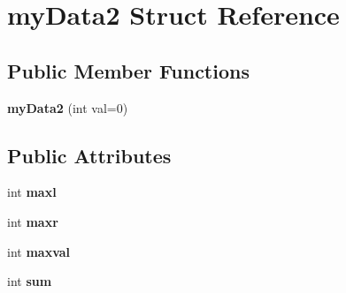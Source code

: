 \hypertarget{structmy_data2}{}\section{my\+Data2 Struct Reference}
\label{structmy_data2}
\subsection*{Public Member Functions}
\begin{DoxyCompactItemize}
\item 
\mbox{\label{structmy_data2_a6de7e3507c4d69d79e9906cbe6f58893}} 
{\bfseries my\+Data2} (int val=0)
\end{DoxyCompactItemize}
\subsection*{Public Attributes}
\begin{DoxyCompactItemize}
\item 
\mbox{\label{structmy_data2_a1ddff11b2e9eddddd60765c40b482e95}} 
int {\bfseries maxl}
\item 
\mbox{\label{structmy_data2_ad81bf8cd80cdf61fcb2256020ff38aa6}} 
int {\bfseries maxr}
\item 
\mbox{\label{structmy_data2_a1c73522418634ac7a280beab2234eb6d}} 
int {\bfseries maxval}
\item 
\mbox{\label{structmy_data2_a49c066b4c9149af6be58841061847a11}} 
int {\bfseries sum}
\end{DoxyCompactItemize}

